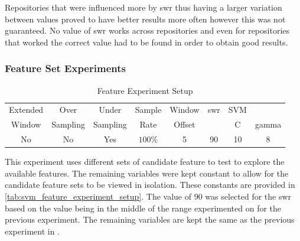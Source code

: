 Repositories that were influenced more by \gls{swr} thus having a larger variation between values proved to have better results more often however this was not guaranteed. No value of \gls{swr} works across repositories and even for repositories that worked the correct value had to be found in order to obtain good results.

    
\subsubsection{Feature Set Experiments}
\label{sec:svm_feature_set_experiments}


\begin{table}[h]
\begin{center}

    \begin{tabular}{|c|c|c|c|c|c|cc|}
        \hline
        Extended & Over & Under & Sample & Window & \gls{swr} & SVM & \\
        Window & Sampling & Sampling & Rate & Offset &  & C & gamma \\ \hline
        No & No & Yes & $100\%$ & 5 & 90 & 10 & 8 \\ \hline
    \end{tabular}
    \caption{Feature Experiment Setup}
    \label{tab:svm_feature_experiment_setup}
\end{center}

\end{table}



This experiment uses different sets of candidate feature to test to explore the available features. The remaining variables were kept constant to allow for the candidate feature sets to be viewed in isolation. These constants are provided in \autoref{tab:svm_feature_experiment_setup}. The value of $90$ was selected for the \gls{swr} based on the value being in the middle of the range experimented on for the previous experiment. The remaining variables are kept the same as the previous experiment in . 

